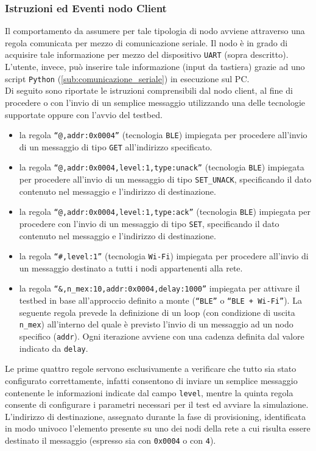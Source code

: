 \subsubsection{Istruzioni ed Eventi nodo Client}
\label{subsub:parametri_testbed}
Il comportamento da assumere per tale tipologia di nodo avviene attraverso una regola comunicata per mezzo di comunicazione seriale. Il nodo è in grado di acquisire tale informazione per mezzo del dispositivo \texttt{UART} (sopra descritto). L'utente, invece, può inserire tale informazione (input da tastiera) grazie ad uno script \texttt{Python} (\ref{sub:comunicazione_seriale}) in esecuzione sul PC. \\

\noindent Di seguito sono riportate le istruzioni comprensibili dal nodo client, al fine di procedere o con l'invio di un semplice messaggio utilizzando una delle tecnologie supportate oppure con l'avvio del testbed.

\begin{itemize}
    \item la regola \texttt{``@,addr:0x0004''} (tecnologia \texttt{BLE}) impiegata per procedere all'invio di un messaggio di tipo \texttt{GET} all'indirizzo specificato.
    \item la regola \texttt{``@,addr:0x0004,level:1,type:unack''} (tecnologia \texttt{BLE}) impiegata per procedere all'invio di un messaggio di tipo \texttt{SET\_UNACK}, specificando il dato contenuto nel messaggio e l'indirizzo di destinazione.
    \item la regola \texttt{``@,addr:0x0004,level:1,type:ack''} (tecnologia \texttt{BLE}) impiegata per procedere con l'invio di un messaggio di tipo \texttt{SET}, specificando il dato contenuto nel messaggio e l'indirizzo di destinazione.
    
    \item la regola \texttt{``\#,level:1''} (tecnologia \texttt{Wi-Fi}) impiegata per procedere all'invio di un messaggio destinato a tutti i nodi appartenenti alla rete.
    
    \item la regola \texttt{``\&,n\_mex:10,addr:0x0004,delay:1000''} impiegata per attivare il testbed in base all'approccio definito a monte (\texttt{``BLE''} o \texttt{``BLE + Wi-Fi''}). La seguente regola prevede la definizione di un loop (con condizione di uscita \texttt{n\_mex}) all'interno del quale è previsto l'invio di un messaggio ad un nodo specifico (\texttt{addr}). Ogni iterazione avviene con una cadenza definita dal valore indicato da \texttt{delay}.

\end{itemize}
\noindent Le prime quattro regole servono esclusivamente a verificare che tutto sia stato configurato correttamente, infatti consentono di inviare un semplice messaggio contenente le informazioni indicate dal campo \texttt{level}, mentre la quinta regola consente di configurare i parametri necessari per il test ed avviare la simulazione. L'indirizzo di destinazione, assegnato durante la fase di provisioning, identificata in modo univoco l'elemento presente su uno dei nodi della rete a cui risulta essere destinato il messaggio (espresso sia con \texttt{0x0004} o con \texttt{4}).\\

